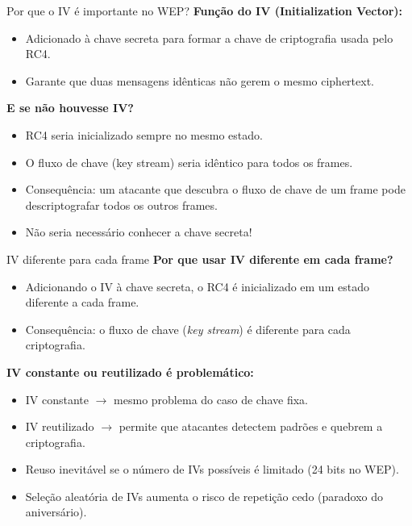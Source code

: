 \begin{frame}{Por que o IV é importante no WEP?}
    \textbf{Função do IV (Initialization Vector):}
    \begin{itemize}
        \item Adicionado à chave secreta para formar a chave de criptografia usada pelo RC4.
        \item Garante que duas mensagens idênticas não gerem o mesmo ciphertext.
    \end{itemize}

    \medskip
    \textbf{E se não houvesse IV?}
    \begin{itemize}
        \item RC4 seria inicializado sempre no mesmo estado.
        \item O fluxo de chave (key stream) seria idêntico para todos os frames.
        \item Consequência: um atacante que descubra o fluxo de chave de um frame pode descriptografar todos os outros frames.
        \item Não seria necessário conhecer a chave secreta!
    \end{itemize}
\end{frame}

\begin{frame}{IV diferente para cada frame}
    \textbf{Por que usar IV diferente em cada frame?}
    \begin{itemize}
        \item Adicionando o IV à chave secreta, o RC4 é inicializado em um estado diferente a cada frame.
        \item Consequência: o fluxo de chave (\emph{key stream}) é diferente para cada criptografia.
    \end{itemize}

    \medskip
    \textbf{IV constante ou reutilizado é problemático:}
    \begin{itemize}
        \item IV constante $\rightarrow$ mesmo problema do caso de chave fixa.
        \item IV reutilizado $\rightarrow$ permite que atacantes detectem padrões e quebrem a criptografia.
        \item Reuso inevitável se o número de IVs possíveis é limitado (24 bits no WEP).
        \item Seleção aleatória de IVs aumenta o risco de repetição cedo (paradoxo do aniversário).
    \end{itemize}
\end{frame}

